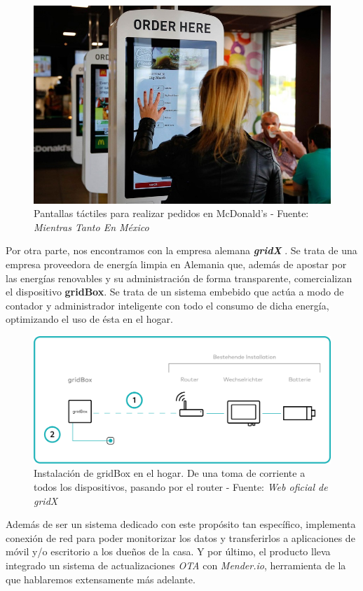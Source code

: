 \begin{figure}[H]
	\centering
	\includegraphics[width=0.75\linewidth]{imagenes/pedido-pantalla-tactil.jpg}
	\caption{Pantallas táctiles para realizar pedidos en McDonald's - Fuente: \textit{Mientras Tanto En México} \cite{mcdonalds-pantalla-tactil-pedidos}}
\end{figure}

Por otra parte, nos encontramos con la empresa alemana \textbf{\textit{gridX}} \cite{gridx}. Se trata de una empresa proveedora de energía limpia en Alemania que, además de apostar por las energías renovables y su administración de forma transparente, comercializan el dispositivo \textbf{gridBox}. Se trata de un sistema embebido que actúa a modo de contador y administrador inteligente con todo el consumo de dicha energía, optimizando el uso de ésta en el hogar.

\begin{figure}[H]
	\centering
	\includegraphics[width=0.75\linewidth]{imagenes/gridbox-utility.png}
	\caption{Instalación de gridBox en el hogar. De una toma de corriente a todos los dispositivos, pasando por el router - Fuente: \textit{Web oficial de gridX} \cite{gridbox}}
	\label{gridbox-installation}
\end{figure}

Además de ser un sistema dedicado con este propósito tan específico, implementa conexión de red para poder monitorizar los datos y transferirlos a aplicaciones de móvil y/o escritorio a los dueños de la casa. Y por último, el producto lleva integrado un sistema de actualizaciones \textit{OTA} con \textit{Mender.io}, herramienta de la que hablaremos extensamente más adelante.\\

